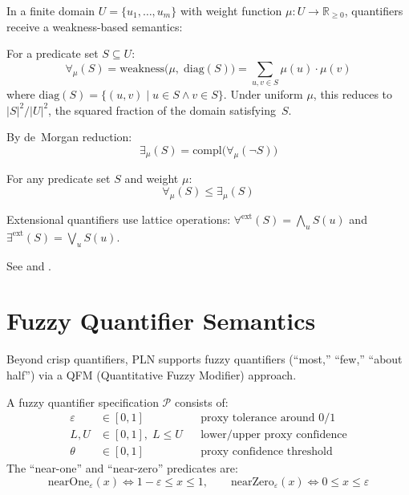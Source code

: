 \documentclass[11pt,openany]{report}
\begin{document}
In a finite domain $U = \{u_1, \ldots, u_m\}$ with weight function
$\mu : U \to \mathbb{R}_{\ge 0}$, quantifiers receive a
weakness-based semantics:

\begin{definition}
For a predicate set $S \subseteq U$:
\[
  \forall_\mu(S) = \mathrm{weakness}\big(\mu,\; \mathrm{diag}(S)\big)
  = \sum_{u, v \in S} \mu(u) \cdot \mu(v)
\]
where $\mathrm{diag}(S) = \{(u,v) \mid u \in S \wedge v \in S\}$.
Under uniform $\mu$, this reduces to $|S|^2/|U|^2$, the squared fraction
of the domain satisfying~$S$.
\end{definition}

\begin{definition}
By de~Morgan reduction:
\[
  \exists_\mu(S) = \mathrm{compl}\big(\forall_\mu(\neg S)\big)
\]
\end{definition}

\begin{theorem}
For any predicate set $S$ and weight $\mu$:
\[
  \forall_\mu(S) \le \exists_\mu(S)
\]
\end{theorem}

Extensional quantifiers use lattice operations: $\forall^{\mathrm{ext}}(S) = \bigwedge_u S(u)$
and $\exists^{\mathrm{ext}}(S) = \bigvee_u S(u)$.

See 
and .

\section{Fuzzy Quantifier Semantics}

Beyond crisp quantifiers, PLN supports fuzzy quantifiers (``most,''
``few,'' ``about half'') via a QFM (Quantitative Fuzzy Modifier) approach.

\begin{definition}
A fuzzy quantifier specification $\mathcal{P}$ consists of:
\begin{align}
  \varepsilon &\in [0,1] && \text{proxy tolerance around 0/1} \\
  L, U &\in [0,1],\; L \le U && \text{lower/upper proxy confidence} \\
  \theta &\in [0,1] && \text{proxy confidence threshold}
\end{align}
The ``near-one'' and ``near-zero'' predicates are:
\[
  \mathrm{nearOne}_\varepsilon(x) \iff 1 - \varepsilon \le x \le 1, \qquad
  \mathrm{nearZero}_\varepsilon(x) \iff 0 \le x \le \varepsilon
\]
\end{definition}
\end{document}
